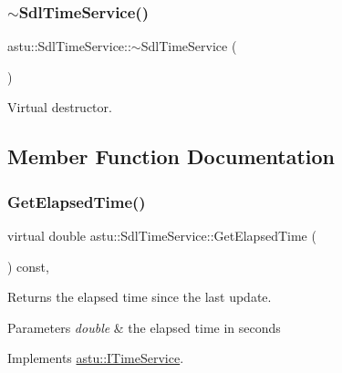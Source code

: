 \subsubsection{\texorpdfstring{$\sim$\+Sdl\+Time\+Service()}{~SdlTimeService()}}
{\footnotesize\ttfamily astu\+::\+Sdl\+Time\+Service\+::$\sim$\+Sdl\+Time\+Service (\begin{DoxyParamCaption}{ }\end{DoxyParamCaption})\hspace{0.3cm}{\ttfamily [inline]}}

Virtual destructor. 

\subsection{Member Function Documentation}
\mbox{\label{classastu_1_1SdlTimeService_a6652d19cae14e20ec85a1808fc8e87b7}} 
\subsubsection{\texorpdfstring{Get\+Elapsed\+Time()}{GetElapsedTime()}}
{\footnotesize\ttfamily virtual double astu\+::\+Sdl\+Time\+Service\+::\+Get\+Elapsed\+Time (\begin{DoxyParamCaption}{ }\end{DoxyParamCaption}) const\hspace{0.3cm}{\ttfamily [override]}, {\ttfamily [virtual]}}

Returns the elapsed time since the last update.


\begin{DoxyParams}{Parameters}
{\em double} & the elapsed time in seconds \\
\hline
\end{DoxyParams}


Implements \hyperlink{classastu_1_1ITimeService_af38c6c5f4fedc705c14b01f2c61b0afc}{astu\+::\+I\+Time\+Service}.

\mbox{\label{classastu_1_1SdlTimeService_a6a1b864beed186413933dd8b97a393a2}} 
